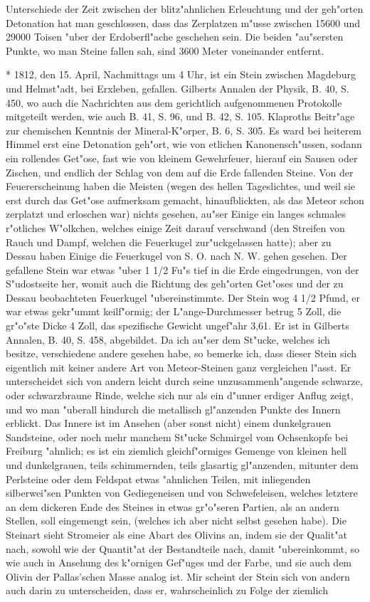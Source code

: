 \documentclass[a4paper, 11pt, oneside, polutonikogreek, german]{article}
\begin{document}
Unterschiede der Zeit zwischen der blitz"ahnlichen Erleuchtung und der geh"orten Detonation hat man geschlossen, dass das Zerplatzen m"usse zwischen 15600 und 29000 Toisen "uber der Erdoberfl"ache geschehen sein. Die beiden "au"sersten Punkte, wo man Steine fallen sah, sind 3600 Meter voneinander entfernt.

* 1812, den 15. April, Nachmittags um 4 Uhr, ist ein Stein zwischen Magdeburg und Helmst"adt, bei Erxleben, gefallen. Gilberts Annalen der Physik, B. 40, S. 450, wo auch die Nachrichten aus dem gerichtlich aufgenommenen Protokolle mitgeteilt werden, wie auch B. 41, S. 96, und B. 42, S. 105. Klaproths Beitr"age zur chemischen Kenntnis der Mineral-K"orper, B. 6, S. 305. Es ward bei heiterem Himmel erst eine Detonation geh"ort, wie von etlichen Kanonensch"ussen, sodann ein rollendes Get"ose, fast wie von kleinem Gewehrfeuer, hierauf ein Sausen oder Zischen, und endlich der Schlag von dem auf die Erde fallenden Steine. Von der Feuererscheinung haben die Meisten (wegen des hellen Tageslichtes, und weil sie erst durch das Get"ose aufmerksam gemacht, hinaufblickten, als das Meteor schon zerplatzt und erloschen war) nichts gesehen, au"ser Einige ein langes schmales r"otliches W"olkchen, welches einige Zeit darauf verschwand (den Streifen von Rauch und Dampf, welchen die Feuerkugel zur"uckgelassen hatte); aber zu Dessau haben Einige die Feuerkugel von S. O. nach N. W. gehen gesehen. Der gefallene Stein war etwas "uber 1 1/2 Fu"s tief in die Erde eingedrungen, von der S"udostseite her, womit auch die Richtung des geh"orten Get"oses und der zu Dessau beobachteten Feuerkugel "ubereinstimmte. Der Stein wog 4 1/2 Pfund, er war etwas gekr"ummt keilf"ormig; der L"ange-Durchmesser betrug 5 Zoll, die gr"o"ste Dicke 4 Zoll, das spezifische Gewicht ungef"ahr 3,61. Er ist in Gilberts Annalen, B. 40, S. 458, abgebildet. Da ich au"ser dem St"ucke, welches ich besitze, verschiedene andere gesehen habe, so bemerke ich, dass dieser Stein sich eigentlich mit keiner andere Art von Meteor-Steinen ganz vergleichen l"asst. Er unterscheidet sich von andern leicht durch seine unzusammenh"angende schwarze, oder schwarzbraune Rinde, welche sich nur als ein d"unner erdiger Anflug zeigt, und wo man "uberall hindurch die metallisch gl"anzenden Punkte des Innern erblickt. Das Innere ist im Ansehen (aber sonst nicht) einem dunkelgrauen Sandsteine, oder noch mehr manchem St"ucke Schmirgel vom Ochsenkopfe bei Freiburg "ahnlich; es ist ein ziemlich gleichf"ormiges Gemenge von kleinen hell und dunkelgrauen, teils schimmernden, teils glasartig gl"anzenden, mitunter dem Perlsteine oder dem Feldspat etwas "ahnlichen Teilen, mit inliegenden silberwei"sen Punkten von Gediegeneisen und von Schwefeleisen, welches letztere an dem dickeren Ende des Steines in etwas gr"o"seren Partien, als an andern Stellen, soll eingemengt sein, (welches ich aber nicht selbst gesehen habe). Die Steinart sieht Stromeier als eine Abart des Olivins an, indem sie der Qualit"at nach, sowohl wie der Quantit"at der Bestandteile nach, damit "ubereinkommt, so wie auch in Ansehung des k"ornigen Gef"uges und der Farbe, und sie auch dem Olivin der Pallas'schen Masse analog ist. Mir scheint der Stein sich von andern auch darin zu unterscheiden, dass er, wahrscheinlich zu Folge der ziemlich 
\end{document}
